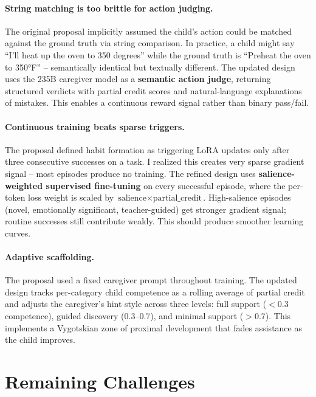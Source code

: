 \documentclass[11pt]{article}
\begin{document}
\paragraph{String matching is too brittle for action judging.} The original proposal implicitly assumed the child's action could be matched against the ground truth via string comparison. In practice, a child might say ``I'll heat up the oven to 350 degrees'' while the ground truth is ``Preheat the oven to 350°F'' -- semantically identical but textually different. The updated design uses the 235B caregiver model as a \textbf{semantic action judge}, returning structured verdicts with partial credit scores and natural-language explanations of mistakes. This enables a continuous reward signal rather than binary pass/fail.

\paragraph{Continuous training beats sparse triggers.} The proposal defined habit formation as triggering LoRA updates only after three consecutive successes on a task. I realized this creates very sparse gradient signal -- most episodes produce no training. The refined design uses \textbf{salience-weighted supervised fine-tuning} on every successful episode, where the per-token loss weight is scaled by $\text{salience} \times \text{partial\_credit}$. High-salience episodes (novel, emotionally significant, teacher-guided) get stronger gradient signal; routine successes still contribute weakly. This should produce smoother learning curves.

\paragraph{Adaptive scaffolding.} The proposal used a fixed caregiver prompt throughout training. The updated design tracks per-category child competence as a rolling average of partial credit and adjusts the caregiver's hint style across three levels: full support ($<$0.3 competence), guided discovery (0.3--0.7), and minimal support ($>$0.7). This implements a Vygotskian zone of proximal development that fades assistance as the child improves.

\section{Remaining Challenges}
\end{document}
